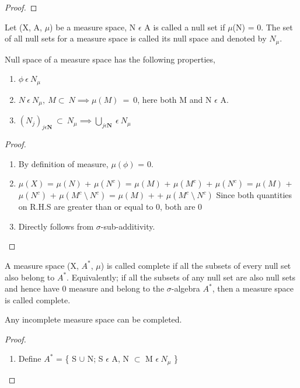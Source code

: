 \begin{proof}
\end{proof}
\begin{definition}
    Let (X, A, $\mu$) be a measure space, N $\epsilon$ A is called a null set if
    $\mu$(N) = 0. The set of all null sets for a measure space is called its
    null space and denoted by $N_{\mu}$.
\end{definition}
\begin{lemma}
    Null space of a measure space has the following properties,
    \begin{enumerate}
        \item $\phi \: \epsilon \: N_{\mu}$
        \item $N \: \epsilon \: N_{\mu}, \: M \subset \: N \implies \mu(M) \: = \:
            0$, here both M and N $\epsilon$ A.
        \item $(N_j)_{j\epsilon\bm{N}} \: \subset \: N_\mu \implies
            \bigcup_{j\epsilon\bm{N}} \: \epsilon \: N_\mu$
    \end{enumerate}
\end{lemma}
\begin{proof}
    \begin{enumerate}
        \item By definition of measure, $\mu(\phi)$ = 0.
        \item $\mu(X)$ = $\mu(N)$ + $\mu(N^c)$ = $\mu(M)$ + $\mu(M^c)$
             + $\mu(N^c)$ = $\mu(M)$ + $\mu(N^c)$ + $\mu(M^c \:
            \setminus \: N^c)$
             = $\mu(M)$ +  + $\mu(M^c \: \setminus \: N^c)$
            \newline Since both quantities on R.H.S are greater than or equal
            to 0, both are 0
        \item Directly follows from $\sigma$-sub-additivity.

    \end{enumerate}
\end{proof}
\begin{definition}
    A measure space (X, $A^*$, $\mu$) is called complete if all the subsets of
    every null set also belong to $A^*$. Equivalently; if all the subsets of any
    null set are also null sets and hence have 0 measure and belong to the
    $\sigma$-algebra $A^*$, then a measure space is called complete.
\end{definition}
\begin{theorem}
    Any incomplete measure space can be completed.
\end{theorem}
\begin{proof}
    \begin{enumerate}
        \item Define $A^*$ = \{ S $\cup$ N; S $\epsilon$ A, N $\subset$ M
            $\epsilon \: N_\mu$ \}
    \end{enumerate}
\end{proof}


